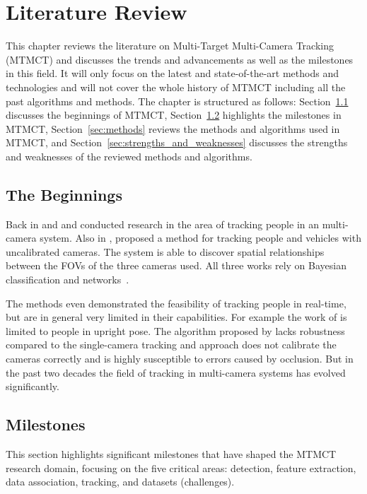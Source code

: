 \chapter{Literature Review}\label{chap:literature_review}
This chapter reviews the literature on Multi-Target Multi-Camera Tracking (MTMCT) and discusses the trends and advancements as well as the milestones in this field. It will only focus on the latest and state-of-the-art methods and technologies and will not cover the whole history of MTMCT including all the past algorithms and methods. The chapter is structured as follows: Section~\ref{sec:the_beginnings} discusses the beginnings of MTMCT, Section~\ref{sec:milestones} highlights the milestones in MTMCT, Section~\ref{sec:methods} reviews the methods and algorithms used in MTMCT, and Section~\ref{sec:strengths_and_weaknesses} discusses the strengths and weaknesses of the reviewed methods and algorithms.

\section{The Beginnings}\label{sec:the_beginnings}
Back in \citeyear{Cai99} and \citeyear{Chang01} \textcite{Cai99} and \textcite{Chang01} conducted research in the area of tracking people in an multi-camera system. Also in \citeyear{Khan01}, \textcite{Khan01} proposed a method for tracking people and vehicles with uncalibrated cameras. The system is able to discover spatial relationships between the FOVs of the three cameras used. All three works rely on Bayesian classification and networks~\cite{Pearl88}.

The methods even demonstrated the feasibility of tracking people in real-time, but are in general very limited in their capabilities. For example the work of \citeauthor{Chang01} is limited to people in upright pose. The algorithm proposed by \citeauthor{Cai99} lacks robustness compared to the single-camera tracking and \citeauthor{Khan01} approach does not calibrate the cameras correctly and is highly susceptible to errors caused by occlusion. But in the past two decades the field of tracking in multi-camera systems has evolved significantly.

\section{Milestones}\label{sec:milestones}
This section highlights significant milestones that have shaped the MTMCT research domain, focusing on the five critical areas: detection, feature extraction, data association, tracking, and datasets (challenges).

